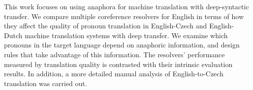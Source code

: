 This work focuses on using anaphora for machine translation with deep-syntactic transfer. We compare multiple coreference resolvers for English in terms of how they affect the quality of pronoun translation in English-Czech and English-Dutch machine translation systems with deep transfer. We examine which pronouns in the target language depend on anaphoric information, and design rules that take advantage of this information. The resolvers' performance measured by translation quality is contrasted with their intrinsic evaluation results. In addition, a more detailed manual analysis of English-to-Czech translation was carried out.
